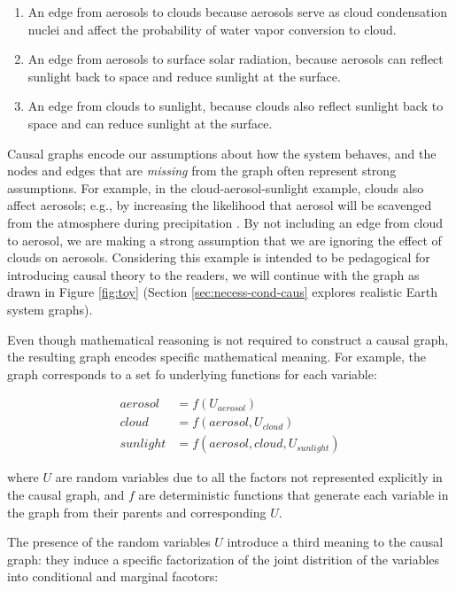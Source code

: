 \documentclass[12pt]{article}
\begin{document}
\begin{enumerate}
\item An edge from aerosols to clouds because aerosols serve as cloud
  condensation nuclei and affect the probability of water vapor
  conversion to cloud.
\item An edge from aerosols to surface solar radiation, because
  aerosols can reflect sunlight back to space and reduce sunlight
  at the surface.
\item An edge from clouds to sunlight, because clouds also reflect
  sunlight back to space and can reduce sunlight at the surface.
\end{enumerate}

Causal graphs encode our assumptions about how the system behaves, and
the nodes and edges that are \textit{missing} from the graph often
represent strong assumptions. For example, in the
cloud-aerosol-sunlight example, clouds also affect aerosols; e.g., by
increasing the likelihood that aerosol will be scavenged from the
atmosphere during precipitation \citep[e.g.,][]{radke-scavenge-1980,
  JURADO20087931, blanco-alegre2018}. By not including an edge from
cloud to aerosol, we are making a strong assumption that we are
ignoring the effect of clouds on aerosols. Considering this example is
intended to be pedagogical for introducing causal theory to the
readers, we will continue with the graph as drawn in Figure
\ref{fig:toy} (Section \ref{sec:necess-cond-caus} explores realistic
Earth system graphs).

Even though mathematical reasoning is not required to construct a
causal graph, the resulting graph encodes specific mathematical
meaning. For example, the graph corresponds to a set fo underlying
functions for each variable:

\begin{align}
  \label{eq:2}
  aerosol &= f(U_{aerosol}) \\
  cloud &= f(aerosol, U_{cloud})\\
  sunlight &= f(aerosol, cloud, U_{sunlight})
\end{align}

where $U$ are random variables due to all the factors not represented
explicitly in the causal graph, and $f$ are deterministic functions
that generate each variable in the graph from their parents and
corresponding $U$.

The presence of the random variables $U$ introduce
a third meaning to the causal graph: they induce a specific
factorization of the joint distrition of the variables into
conditional and marginal facotors:
\end{document}
